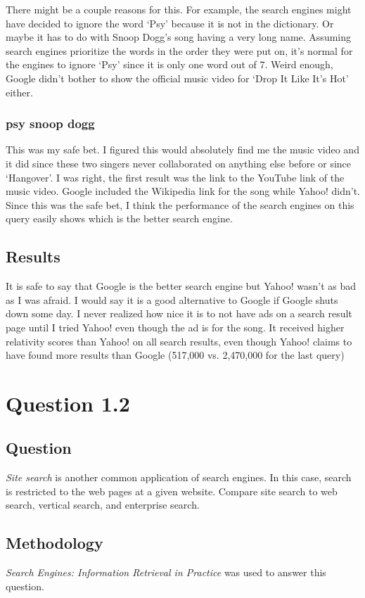 \documentclass[10pt,letterpaper,bibliography=totocnumbered]{scrartcl}
\begin{document}
There might be a couple reasons for this. For example, the search engines might have decided to ignore the word `Psy' because it is not in the dictionary. Or maybe it has to do with Snoop Dogg's song having a very long name. Assuming search engines prioritize the words in the order they were put on, it's normal for the engines to ignore `Psy' since it is only one word out of 7. Weird enough, Google didn't bother to show the official music video for `Drop It Like It's Hot' either.

\subsubsection{psy snoop dogg}
This was my safe bet. I figured this would absolutely find me the music video and it did since these two singers never collaborated on anything else before or since `Hangover'. I was right, the first result was the link to the YouTube link of the music video. Google included the Wikipedia link for the song while Yahoo! didn't. Since this was the safe bet, I think the performance of the search engines on this query easily shows which is the better search engine.

\subsection{Results}
It is safe to say that Google is the better search engine but Yahoo! wasn't as bad as I was afraid. I would say it is a good alternative to Google if Google shuts down some day. I never realized how nice it is to not have ads on a search result page until I tried Yahoo! even though the ad is for the song. It received higher relativity scores than Yahoo! on all search results, even though Yahoo! claims to have found more results than Google (517,000 vs. 2,470,000 for the last query)


\section{Question 1.2}
\subsection{Question}
\textit{Site search} is another common application of search engines. In this case,
search is restricted to the web pages at a given website. Compare site search to
web search, vertical search, and enterprise search.

\subsection{Methodology}
\textit{Search Engines: Information Retrieval in Practice} \cite{classtext} was used to answer this question.
\end{document}
